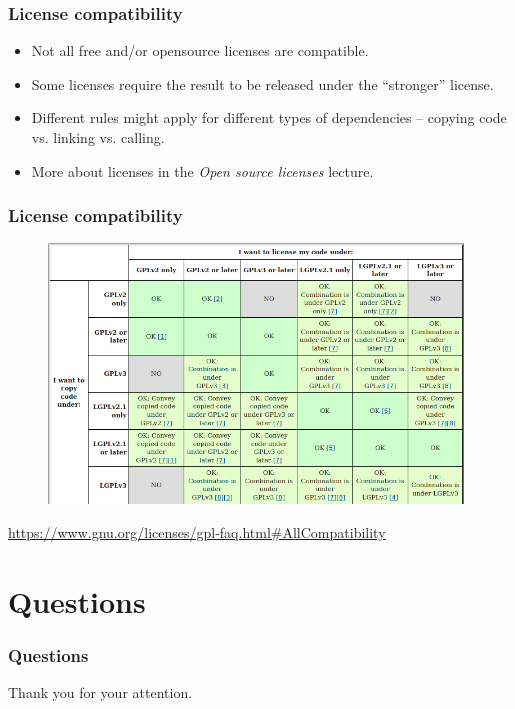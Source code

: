 \documentclass[aspectratio=169]{beamer}              %
\begin{document}
\begin{frame}
	\frametitle{License compatibility}
	
	\begin{block}{}
		\begin{itemize}
			\item Not all free and/or opensource licenses are compatible.
			\item Some licenses require the result to be released under the ``stronger'' license.
			\item Different rules might apply for different types of dependencies -- copying code vs. linking vs. calling.
			\item More about licenses in the \emph{Open source licenses} lecture.
		\end{itemize}
	\end{block}
	
	
\end{frame}

\begin{frame}
	\frametitle{License compatibility}
	
	\begin{figure}[ht!]
	\begin{center}
  	  \includegraphics[width=11cm]{img/license-compatibility.png}
	\end{center}
	\end{figure}

\tiny{\url{https://www.gnu.org/licenses/gpl-faq.html\#AllCompatibility}}
\end{frame}



\section{Questions}

\begin{frame}
	\frametitle{Questions}

	\begin{center}
	Thank you for your attention.
	\end{center}

\vspace{0.5cm}

	\begin{center}
	\end{center}
\end{frame}
\end{document}

